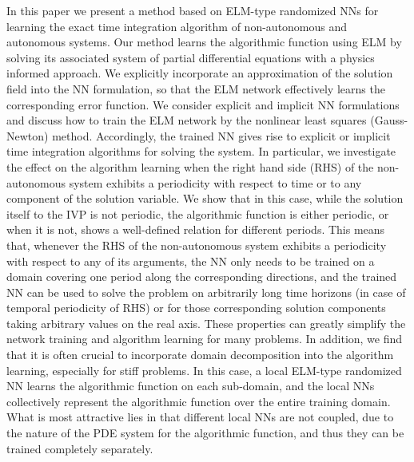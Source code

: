
In this paper we present a method based on ELM-type randomized NNs
for learning the exact time integration algorithm of non-autonomous and autonomous
systems. Our method learns the 
algorithmic function using ELM by solving its associated
system of partial differential equations  with a physics informed approach.
We explicitly incorporate an approximation of the solution field 
into the NN formulation, so that the ELM network effectively learns
the corresponding error function.
We consider  explicit and implicit NN formulations and discuss how to
train the ELM network by the nonlinear least squares (Gauss-Newton) method.
Accordingly, the trained NN
gives rise to explicit or implicit time integration algorithms for solving
the system.
%
In particular, we investigate the effect on the algorithm learning
when the right hand side (RHS) of the non-autonomous system
exhibits a periodicity with respect to time or to
any component of the solution variable.
We show that in this case, while the solution itself to the IVP is not periodic,
the algorithmic function  is either periodic, or when it is not, shows
a well-defined relation for different periods.
This means that, whenever the RHS of the non-autonomous system exhibits a
periodicity with respect to any of its arguments, the NN  only
needs to be trained on a domain covering one period along the corresponding
directions, and the trained NN can be used to solve the problem
on arbitrarily long time horizons (in case of temporal periodicity of RHS)
or for those corresponding solution components taking arbitrary values on
the real axis. These properties can greatly simplify the network training
and algorithm learning  for many problems.
%
In addition, we find that it is often crucial to incorporate domain decomposition
into the algorithm learning, especially for stiff problems.
In this case, a local ELM-type randomized NN learns the algorithmic function
on each sub-domain, and the local NNs  collectively represent
the algorithmic function over the entire  training domain.
What is most attractive lies in that different local NNs are not coupled,
due to the nature of the PDE system for the algorithmic function,
and thus they can be trained completely separately. 


